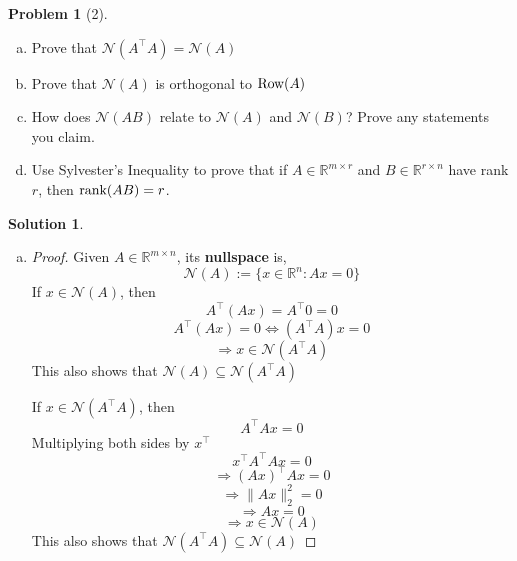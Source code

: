 \documentclass{amsart}[11pt]
\theoremstyle{definition}
\newtheorem*{problem}{Problem}
\newtheorem*{solution}{Solution}
\newcommand{\R}{\mathbb{R}}
\providecommand{\norm}[1]{\lVert#1\rVert}
\newcommand{\row}{\textnormal{Row}}
\newcommand{\rank}{\textnormal{rank}}
\begin{document}
\begin{problem}[2]
\begin{enumerate}[(a)]
    \item Prove that $\mathcal{N}(A^\top A)=\mathcal{N}(A)$
    \item Prove that $\mathcal{N}(A)$ is orthogonal to $\row(A)$
    \item How does $\mathcal{N}(AB)$ relate to $\mathcal{N}(A)$ and $\mathcal{N}(B)$? Prove any statements you claim.
    \item Use Sylvester's Inequality to prove that if $A\in\R^{m\times r}$ and $B\in\R^{r\times n}$ have rank $r$, then $\rank(AB)=r$.
\end{enumerate}
\begin{solution}
    \begin{enumerate}[(a)]
        \item \begin{proof}
            Given $A\in\R^{m\times n}$, its \textbf{nullspace} is, 
            \[ \mathcal{N}(A):=\{x\in\R^n:Ax=0\} \]
            If $x\in\mathcal{N}(A)$, then
            \[A^\top(Ax)=A^\top0=0\]
            \[A^\top(Ax)=0\Leftrightarrow (A^\top A)x=0\]
            \[\Rightarrow x\in\mathcal{N}(A^\top A)\]
            This also shows that $\mathcal{N}(A) \subseteq \mathcal{N}(A^\top A)$

            \vspace{\baselineskip}
            \noindent If $x\in\mathcal{N}(A^\top A)$, then
            \[A^\top Ax=0\]
            Multiplying both sides by $x^\top$
            \[x^\top A^\top Ax=0\]
            \[\Rightarrow (Ax)^\top Ax=0\]
            \[\Rightarrow \norm{Ax}_2^2=0\]
            \[\Rightarrow Ax=0\] 
            \[\Rightarrow x\in\mathcal{N}(A)\] 
            This also shows that $\mathcal{N}(A^\top A) \subseteq \mathcal{N}(A) $
            

\end{proof}
\end{enumerate}
\end{solution}
\end{problem}
\end{document}
